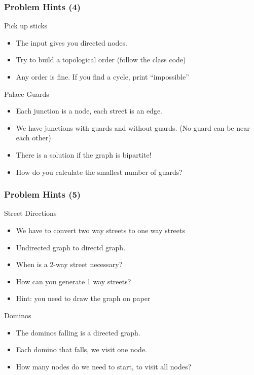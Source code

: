\documentclass{beamer}
\begin{document}
\begin{frame}
  \frametitle{Problem Hints (4)}
  {\smaller
  \begin{block}{Pick up sticks}
    \begin{itemize}
    \item The input gives you directed nodes. 
    \item Try to build a topological order (follow the class code)
    \item Any order is fine. If you find a cycle, print ``impossible''
    \end{itemize}
  \end{block}
  \begin{block}{Palace Guards}
    \begin{itemize}
    \item Each junction is a node, each street is an edge. 
    \item We have junctions with guards and without guards. (No guard can be near each other)
    \item There is a solution if the graph is bipartite!
    \item How do you calculate the smallest number of guards?
    \end{itemize}
  \end{block}}
\end{frame}

\begin{frame}
  \frametitle{Problem Hints (5)}
  {\smaller
  \begin{block}{Street Directions}
    \begin{itemize}
    \item We have to convert two way streets to one way streets 
    \item Undirected graph to directd graph. 
    \item When is a 2-way street \alert{necessary}?
    \item How can you generate 1 way streets?
    \item Hint: you need to draw the graph on paper
    \end{itemize}
  \end{block}
  \begin{block}{Dominos}
    \begin{itemize}
    \item The dominos falling is a directed graph. 
    \item Each domino that falls, we visit one node.
    \item How many nodes do we need to start, to visit all nodes?
    \end{itemize}
  \end{block}}
\end{frame}
\end{document}
